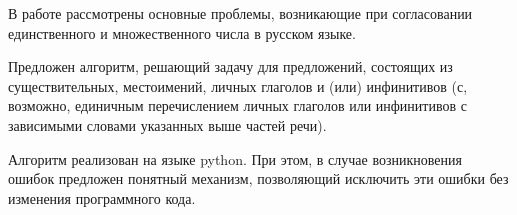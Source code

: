 \documentclass[main]{subfiles}
\begin{document}
В работе рассмотрены основные проблемы, возникающие при согласовании единственного и множественного числа в русском языке.

Предложен алгоритм, решающий задачу для предложений, состоящих из существительных, местоимений, личных глаголов и (или) инфинитивов (с, возможно, единичным перечислением личных глаголов или инфинитивов с зависимыми словами указанных выше частей речи).

Алгоритм реализован на языке python. При этом, в случае возникновения ошибок предложен понятный механизм, позволяющий исключить эти ошибки без изменения программного кода.
\end{document}
